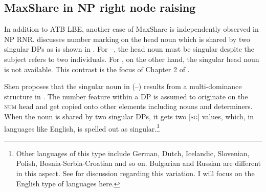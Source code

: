 \documentclass[output=paper]{langscibook}
\begin{document}
\subsection{MaxShare in NP right node raising}
\label{shensect:rnr}

In addition to ATB LBE, another case of MaxShare is independently observed in NP RNR.
\cite{Shen:2018a} discusses number marking on the head noun which is shared by two singular DPs as is shown in . 
For --, the head noun must be singular despite the subject refers to two individuals. 
For , on the other hand, the singular head noun is not available. 
This contrast is the focus of Chapter 2 of \cite{Shen:2018a}.

\ea 
	\label{shennrnr}
	\z 
\z 
{}
Shen proposes that the singular noun in (--) results from a multi-dominance structure in . The number feature within a DP is assumed to originate on the \textsc{num} head and get copied onto other elements including nouns and determiners. When the noun is shared by two singular DPs, it gets two [\textsc{sg}] values, which, in languages like English, is spelled out as singular.\footnote{Other languages of this type include German, Dutch, Icelandic, Slovenian, Polish, Bosnia-Serbia-Croatian and so on. Bulgarian and Russian are different in this aspect. See \cite{Shen:2019} for discussion regarding this variation. I will focus on the English type of languages here.} 


%
\end{document}
